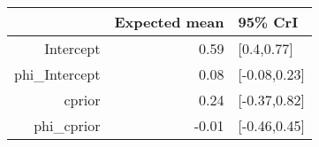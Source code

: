 \begin{tabular}{rrl}
  \hline
 & Expected mean & 95\% CrI \\ 
  \hline
Intercept & 0.59 & [0.4,0.77] \\ 
  phi\_Intercept & 0.08 & [-0.08,0.23] \\ 
  cprior & 0.24 & [-0.37,0.82] \\ 
  phi\_cprior & -0.01 & [-0.46,0.45] \\ 
   \hline
\end{tabular}

